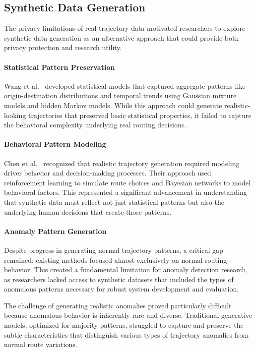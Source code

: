 \documentclass[runningheads]{llncs}
\begin{document}
\subsection{Synthetic Data Generation}
\label{sec:generation-review}

The privacy limitations of real trajectory data motivated researchers to explore synthetic data generation as an alternative approach that could provide both privacy protection and research utility.

\paragraph{Statistical Pattern Preservation}
Wang et al.~\cite{wang2023comprehensive} developed statistical models that captured aggregate patterns like origin-destination distributions and temporal trends using Gaussian mixture models and hidden Markov models. While this approach could generate realistic-looking trajectories that preserved basic statistical properties, it failed to capture the behavioral complexity underlying real routing decisions.

\paragraph{Behavioral Pattern Modeling}
Chen et al.~\cite{chen2023behavior} recognized that realistic trajectory generation required modeling driver behavior and decision-making processes. Their approach used reinforcement learning to simulate route choices and Bayesian networks to model behavioral factors. This represented a significant advancement in understanding that synthetic data must reflect not just statistical patterns but also the underlying human decisions that create those patterns.

\paragraph{Anomaly Pattern Generation}
Despite progress in generating normal trajectory patterns, a critical gap remained: existing methods focused almost exclusively on normal routing behavior. This created a fundamental limitation for anomaly detection research, as researchers lacked access to synthetic datasets that included the types of anomalous patterns necessary for robust system development and evaluation.

The challenge of generating realistic anomalies proved particularly difficult because anomalous behavior is inherently rare and diverse. Traditional generative models, optimized for majority patterns, struggled to capture and preserve the subtle characteristics that distinguish various types of trajectory anomalies from normal route variations.
\end{document}
